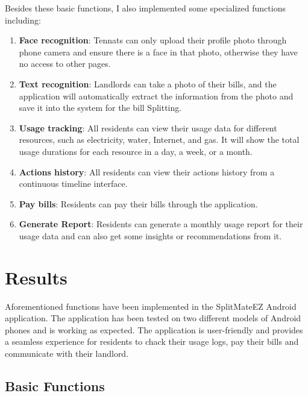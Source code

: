 \documentclass[sigconf]{acmart}
\begin{document}
Besides these basic functions, I also implemented some specialized functions including: 
\begin{enumerate}
  \item \textbf{Face recognition}: Tennats can only upload their profile photo through phone camera and ensure there is a face in that photo, otherwise they have no access to other pages.
  \item \textbf{Text recognition}: Landlords can take a photo of their bills, and the application will automatically extract the information from the photo and save it into the system for the bill Splitting.
  \item \textbf{Usage tracking}: All residents can view their usage data for different resources, such as electricity, water, Internet, and gas. It will show the total usage durations for each resource in a day, a week, or a month.
  \item \textbf{Actions history}: All residents can view their actions history from a continuous timeline interface.
  \item \textbf{Pay bills}: Residents can pay their bills through the application.
  \item \textbf{Generate Report}: Residents can generate a monthly usage report for their usage data and can also get some insights or recommendations from it.
\end{enumerate}


\section{Results}
Aforementioned functions have been implemented in the SplitMateEZ Android application. The application has been tested on two different models of Android phones and is working as expected. The application is user-friendly and provides a seamless experience for residents to chack their usage logs, pay their bills and communicate with their landlord.
\subsection{Basic Functions}
\end{document}
